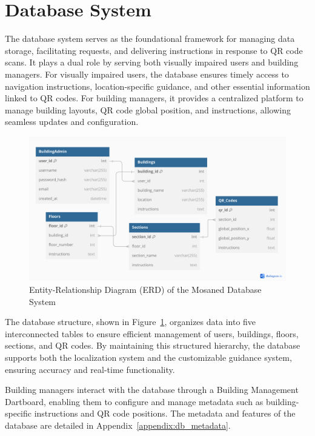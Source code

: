 

\section{Database System}

The database system serves as the foundational framework for managing data storage, facilitating requests, and delivering instructions in response to QR code scans. It plays a dual role by serving both visually impaired users and building managers. For visually impaired users, the database ensures timely access to navigation instructions, location-specific guidance, and other essential information linked to QR codes. For building managers, it provides a centralized platform to manage building layouts, QR code global position, and instructions, allowing seamless updates and configuration.

\begin{figure}[h]
	\centering
	\includegraphics[width=1\linewidth]{assets/ch3/our_ERD}
	\caption{Entity-Relationship Diagram (ERD) of the Mosaned Database System}
	\label{fig:our_ERD}
\end{figure}

The database structure, shown in Figure~\ref{fig:our_ERD}, organizes data into five interconnected tables to ensure efficient management of users, buildings, floors, sections, and QR codes. By maintaining this structured hierarchy, the database supports both the localization system and the customizable guidance system, ensuring accuracy and real-time functionality.

Building managers interact with the database through a Building Management Dartboard, enabling them to configure and manage metadata such as building-specific instructions and QR code positions. The metadata and features of the database are detailed in Appendix~\ref{appendix:db_metadata}.


